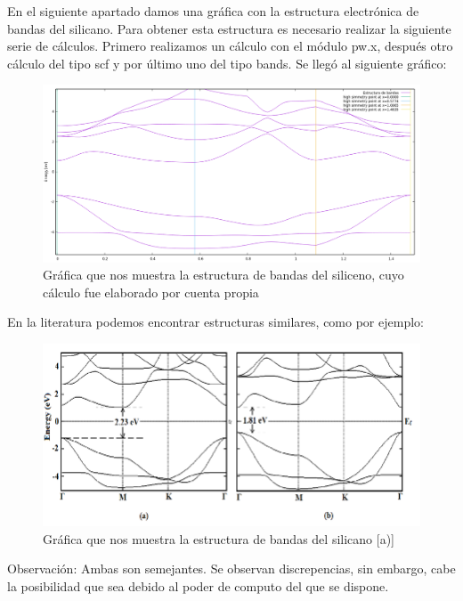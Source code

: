 En el siguiente apartado damos una gráfica con la estructura electrónica de bandas del silicano. 
Para obtener esta estructura es necesario realizar la siguiente serie de cálculos.
Primero realizamos un cálculo con el módulo pw.x, después otro cálculo 
del tipo scf y por último uno del tipo bands. Se llegó al siguiente gráfico:

\begin{figure}[H]
    \centering
    \includegraphics[scale=0.45]{images_silicano/bands_structure_silicane_10_bands_relax.png}
    \caption{Gráfica que nos muestra la estructura de bandas del siliceno, cuyo cálculo fue elaborado por cuenta propia}
\end{figure}

En la literatura podemos encontrar estructuras similares, como por ejemplo:

\begin{figure}[H]
    \centering
    \includegraphics[scale=0.5]{images_silicano/Bandstructure-of-a-silicane-and-b-germanane.png}
    \caption{Gráfica que nos muestra la estructura de bandas del silicano [a)] \cite{trivedi2014silicene} }
\end{figure}

\vspace{0.2cm}

Observación: Ambas son semejantes. Se observan discrepencias,
sin embargo, cabe la posibilidad que sea debido al poder de computo del que se dispone.


